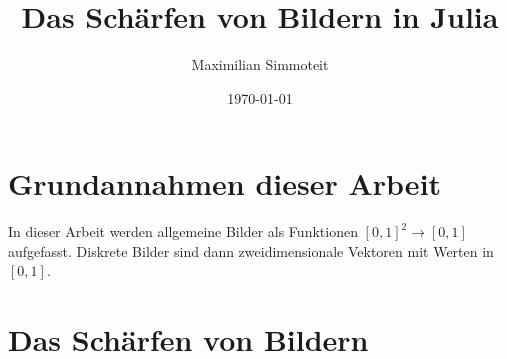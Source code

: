 \documentclass{article}
\theoremstyle{case}
\begin{document}
%
%
\title{Das Schärfen von Bildern in Julia}
%
\author{Maximilian Simmoteit}
%
\date{\today}
%
\maketitle





\section*{Grundannahmen dieser Arbeit}

In dieser Arbeit werden allgemeine Bilder als Funktionen $[0,1]^{2}\rightarrow [0,1]$ aufgefasst. Diskrete Bilder sind dann zweidimensionale Vektoren mit Werten in $[0,1]$. 


\section{Das Schärfen von Bildern}
\end{document}
